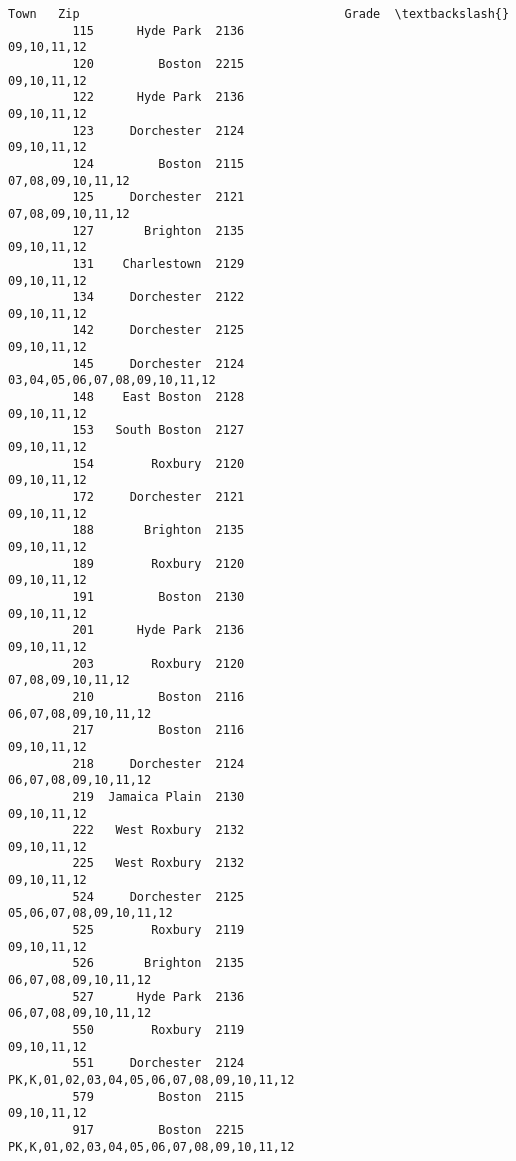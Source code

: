 \documentclass[11pt]{article}
\begin{document}
\begin{Verbatim}[commandchars=\\\{\}]
                       Town   Zip                                     Grade  \textbackslash{}
         115      Hyde Park  2136                               09,10,11,12   
         120         Boston  2215                               09,10,11,12   
         122      Hyde Park  2136                               09,10,11,12   
         123     Dorchester  2124                               09,10,11,12   
         124         Boston  2115                         07,08,09,10,11,12   
         125     Dorchester  2121                         07,08,09,10,11,12   
         127       Brighton  2135                               09,10,11,12   
         131    Charlestown  2129                               09,10,11,12   
         134     Dorchester  2122                               09,10,11,12   
         142     Dorchester  2125                               09,10,11,12   
         145     Dorchester  2124             03,04,05,06,07,08,09,10,11,12   
         148    East Boston  2128                               09,10,11,12   
         153   South Boston  2127                               09,10,11,12   
         154        Roxbury  2120                               09,10,11,12   
         172     Dorchester  2121                               09,10,11,12   
         188       Brighton  2135                               09,10,11,12   
         189        Roxbury  2120                               09,10,11,12   
         191         Boston  2130                               09,10,11,12   
         201      Hyde Park  2136                               09,10,11,12   
         203        Roxbury  2120                         07,08,09,10,11,12   
         210         Boston  2116                      06,07,08,09,10,11,12   
         217         Boston  2116                               09,10,11,12   
         218     Dorchester  2124                      06,07,08,09,10,11,12   
         219  Jamaica Plain  2130                               09,10,11,12   
         222   West Roxbury  2132                               09,10,11,12   
         225   West Roxbury  2132                               09,10,11,12   
         524     Dorchester  2125                   05,06,07,08,09,10,11,12   
         525        Roxbury  2119                               09,10,11,12   
         526       Brighton  2135                      06,07,08,09,10,11,12   
         527      Hyde Park  2136                      06,07,08,09,10,11,12   
         550        Roxbury  2119                               09,10,11,12   
         551     Dorchester  2124  PK,K,01,02,03,04,05,06,07,08,09,10,11,12   
         579         Boston  2115                               09,10,11,12   
         917         Boston  2215  PK,K,01,02,03,04,05,06,07,08,09,10,11,12   
         

\end{Verbatim}
\end{document}
